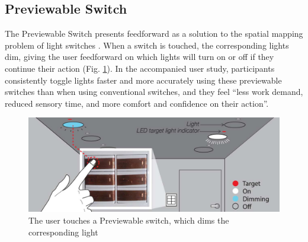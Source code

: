 \documentclass[a4paper,fancychapters]{article}
\begin{document}
	\subsection{Previewable Switch} \label{subsection_previewable_switch}
	The Previewable Switch presents feedforward as a solution to the spatial mapping problem of light switches \cite{park2014previewable}. When a switch is touched, the corresponding lights dim, giving the user feedforward on which lights will turn on or off if they continue their action (Fig. \ref{fig:park2014previewable_demo}). In the accompanied user study, participants consistently toggle lights faster and more accurately using these previewable switches than when using conventional switches, and they feel ``less work demand, reduced sensory time, and more comfort and confidence on their action''.

	\begin{figure}
		\centering
		\includegraphics[width=0.7\linewidth]{img/park2014previewable/demo.png}
		\caption{The user touches a Previewable switch, which dims the corresponding light \cite{park2014previewable}}
		\label{fig:park2014previewable_demo}
	\end{figure}
\end{document}
